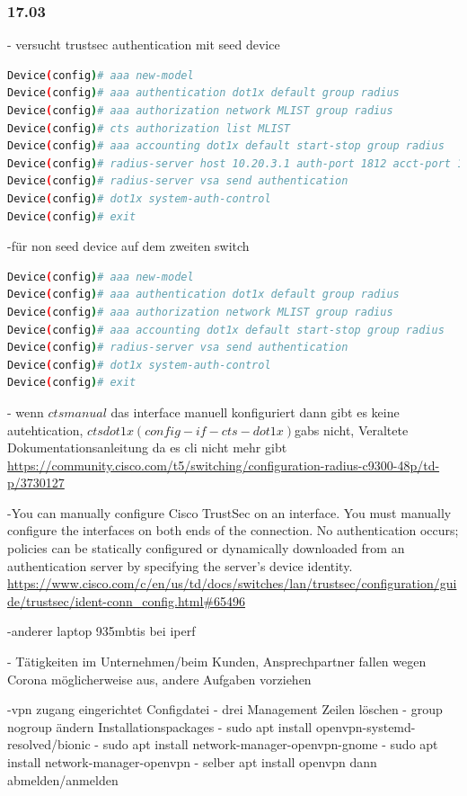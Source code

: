 \documentclass[english,runningheads,a4paper]{llncs}[2018/03/10]
\begin{document}
\subsubsection{17.03}
- versucht trustsec authentication mit seed device
\begin{lstlisting}[language=bash]
 Device(config)# aaa new-model
Device(config)# aaa authentication dot1x default group radius
Device(config)# aaa authorization network MLIST group radius
Device(config)# cts authorization list MLIST
Device(config)# aaa accounting dot1x default start-stop group radius
Device(config)# radius-server host 10.20.3.1 auth-port 1812 acct-port 1813 pac key AbCe1234
Device(config)# radius-server vsa send authentication
Device(config)# dot1x system-auth-control
Device(config)# exit 
\end{lstlisting}
-für non seed device auf dem zweiten switch
\begin{lstlisting}[language=bash]
 Device(config)# aaa new-model
Device(config)# aaa authentication dot1x default group radius
Device(config)# aaa authorization network MLIST group radius
Device(config)# aaa accounting dot1x default start-stop group radius
Device(config)# radius-server vsa send authentication
Device(config)# dot1x system-auth-control
Device(config)# exit 
\end{lstlisting}
- wenn $cts manual$ das interface manuell konfiguriert dann gibt es keine autehtication, $cts dot1x (config-if-cts-dot1x) $gabs nicht, Veraltete Dokumentationsanleitung da es cli nicht mehr gibt \url{https://community.cisco.com/t5/switching/configuration-radius-c9300-48p/td-p/3730127}

-You can manually configure Cisco TrustSec on an interface. You must manually configure the interfaces on both ends of the connection. No authentication occurs; policies can be statically configured or dynamically downloaded from an authentication server by specifying the server’s device identity. \url{https://www.cisco.com/c/en/us/td/docs/switches/lan/trustsec/configuration/guide/trustsec/ident-conn_config.html#65496}

-anderer laptop 935mbtis bei iperf

- Tätigkeiten im Unternehmen/beim Kunden, Ansprechpartner fallen wegen Corona möglicherweise aus, andere Aufgaben vorziehen

-vpn zugang eingerichtet
Configdatei
- drei Management Zeilen löschen
- group nogroup ändern
Installationspackages
- sudo apt install openvpn-systemd-resolved/bionic
- sudo apt install network-manager-openvpn-gnome
- sudo apt install network-manager-openvpn
- selber apt install openvpn
dann abmelden/anmelden
\end{document}
